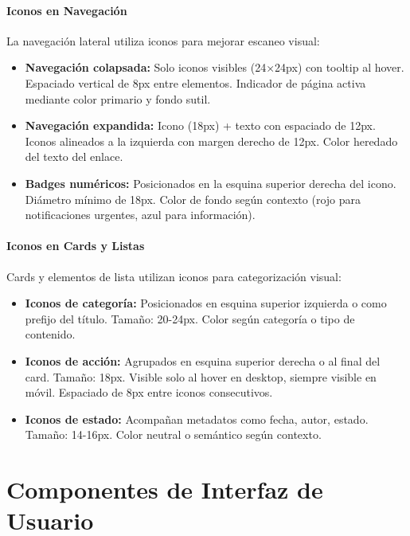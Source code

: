 \documentclass[12pt,a4paper,oneside]{article}
\begin{document}
\paragraph{Iconos en Navegación}
La navegación lateral utiliza iconos para mejorar escaneo visual:

\begin{itemize}
    \item \textbf{Navegación colapsada:} Solo iconos visibles (24×24px) con tooltip al hover. Espaciado vertical de 8px entre elementos. Indicador de página activa mediante color primario y fondo sutil.
    
    \item \textbf{Navegación expandida:} Icono (18px) + texto con espaciado de 12px. Iconos alineados a la izquierda con margen derecho de 12px. Color heredado del texto del enlace.
    
    \item \textbf{Badges numéricos:} Posicionados en la esquina superior derecha del icono. Diámetro mínimo de 18px. Color de fondo según contexto (rojo para notificaciones urgentes, azul para información).
\end{itemize}

\paragraph{Iconos en Cards y Listas}
Cards y elementos de lista utilizan iconos para categorización visual:

\begin{itemize}
    \item \textbf{Iconos de categoría:} Posicionados en esquina superior izquierda o como prefijo del título. Tamaño: 20-24px. Color según categoría o tipo de contenido.
    
    \item \textbf{Iconos de acción:} Agrupados en esquina superior derecha o al final del card. Tamaño: 18px. Visible solo al hover en desktop, siempre visible en móvil. Espaciado de 8px entre iconos consecutivos.
    
    \item \textbf{Iconos de estado:} Acompañan metadatos como fecha, autor, estado. Tamaño: 14-16px. Color neutral o semántico según contexto.
\end{itemize}

\section{Componentes de Interfaz de Usuario}
\end{document}
